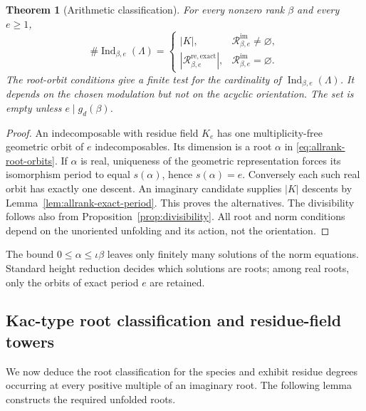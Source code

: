 \documentclass[11pt, reqno]{amsart}
\numberwithin{equation}{section}
\newtheorem{theorem}{Theorem}[section]
\theoremstyle{definition}
\theoremstyle{remark}
\newcommand{\op}[1]{\operatorname{#1}}
\newcommand{\mr}[1]{\mathrm{#1}}
\newcommand{\ms}[1]{\mathscr{#1}}
\newcommand{\Ind}{\op{Ind}}
\begin{document}
\begin{theorem}[Arithmetic classification]
\label{thm:allrank-strata}
For every nonzero rank $\beta$ and every $e\geq1$,
\[
\#\Ind_{\beta,e}(\Lambda)=
 \begin{cases}
   |K|,&\ms R^{\mr{im}}_{\beta,e}\ne\varnothing,\\[2pt]
   |\ms R^{\mr{re,exact}}_{\beta,e}|,
      &\ms R^{\mr{im}}_{\beta,e}=\varnothing.
 \end{cases}
\]
The root-orbit conditions give a finite test for the cardinality
of $\Ind_{\beta,e}(\Lambda)$. It depends on the chosen modulation but
not on the acyclic orientation. The set is empty unless
$e\mid g_d(\beta)$.
\end{theorem}
\begin{proof}
An indecomposable with residue field $K_e$ has one multiplicity-free
geometric orbit of $e$ indecomposables. Its dimension is a root
$\alpha$ in \eqref{eq:allrank-root-orbits}. If $\alpha$ is real,
uniqueness of the geometric representation forces its isomorphism
period to equal $s(\alpha)$, hence $s(\alpha)=e$. Conversely each
such real orbit has exactly one descent. An imaginary candidate
supplies $|K|$ descents by Lemma~\ref{lem:allrank-exact-period}.
This proves the alternatives. The divisibility follows also from
Proposition~\ref{prop:divisibility}. All root and norm
conditions depend on the unoriented unfolding and its action,
not the orientation.
\end{proof}

The bound $0\le\alpha\le\iota\beta$ leaves only finitely many
solutions of the norm equations. Standard height reduction decides
which solutions are roots; among real roots, only the orbits of exact
period $e$ are retained.

\subsection{Kac-type root classification and residue-field towers}
We now deduce the root classification for the species and exhibit
residue degrees occurring at every positive multiple of an imaginary
root. The following lemma constructs the required unfolded roots.
\end{document}

